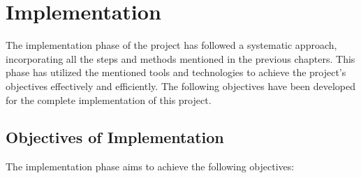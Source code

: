 \chapter{Implementation}
\justify

The implementation phase of the project has followed a systematic approach, incorporating all the steps and methods mentioned in the previous chapters. This phase has utilized the mentioned tools and technologies to achieve the project's objectives effectively and efficiently. The following objectives have been developed for the complete implementation of this project.

\section{Objectives of Implementation}

The implementation phase aims to achieve the following objectives:

